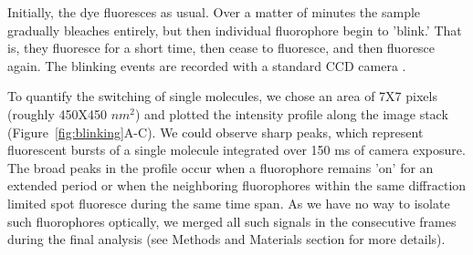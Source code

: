 \documentclass[9pt,twocolumn,twoside]{pnas-new}
\begin{document}
Initially, the dye fluoresces as usual. Over a matter of minutes the sample gradually bleaches entirely, but then individual fluorophore begin to 'blink.' That is, they fluoresce for a short time, then cease to fluoresce, and then fluoresce again. The blinking events are recorded with a standard CCD camera \citep{betzig2006}.

To quantify the switching of single molecules, we chose an area of 7X7 pixels (roughly 450X450 $nm^2$) and plotted the intensity profile along the image stack (Figure~\ref{fig:blinking}A-C). We could observe sharp peaks, which represent fluorescent bursts of a single molecule integrated over 150 ms of camera exposure. The broad peaks in the profile occur when a fluorophore remains 'on' for an extended period or when the neighboring fluorophores within the same diffraction limited spot fluoresce during the same time span. As we have no way to isolate such fluorophores optically, we merged all such signals in the consecutive frames during the final analysis (see Methods and Materials section for more details). 
\end{document}
